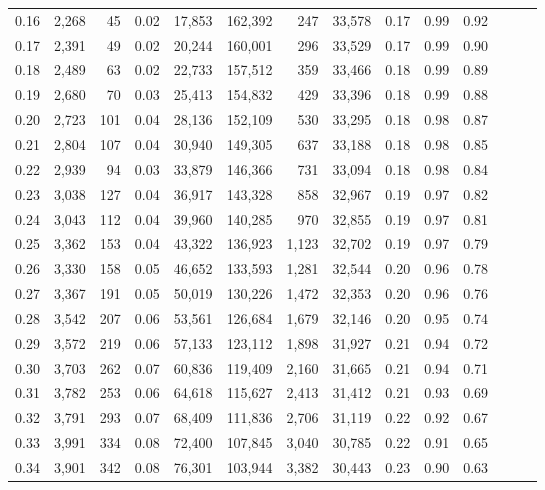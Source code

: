 \begin{tabular}{rrrrrrrrrrrrrr}
0.16 &  2,268 &   45 &  0.02 &   17,853 &  162,392 &     247 &  33,578 &  0.17 &  0.99 &      0.92 \\
0.17 &  2,391 &   49 &  0.02 &   20,244 &  160,001 &     296 &  33,529 &  0.17 &  0.99 &      0.90 \\
0.18 &  2,489 &   63 &  0.02 &   22,733 &  157,512 &     359 &  33,466 &  0.18 &  0.99 &      0.89 \\
0.19 &  2,680 &   70 &  0.03 &   25,413 &  154,832 &     429 &  33,396 &  0.18 &  0.99 &      0.88 \\
0.20 &  2,723 &  101 &  0.04 &   28,136 &  152,109 &     530 &  33,295 &  0.18 &  0.98 &      0.87 \\
0.21 &  2,804 &  107 &  0.04 &   30,940 &  149,305 &     637 &  33,188 &  0.18 &  0.98 &      0.85 \\
0.22 &  2,939 &   94 &  0.03 &   33,879 &  146,366 &     731 &  33,094 &  0.18 &  0.98 &      0.84 \\
0.23 &  3,038 &  127 &  0.04 &   36,917 &  143,328 &     858 &  32,967 &  0.19 &  0.97 &      0.82 \\
0.24 &  3,043 &  112 &  0.04 &   39,960 &  140,285 &     970 &  32,855 &  0.19 &  0.97 &      0.81 \\
0.25 &  3,362 &  153 &  0.04 &   43,322 &  136,923 &   1,123 &  32,702 &  0.19 &  0.97 &      0.79 \\
0.26 &  3,330 &  158 &  0.05 &   46,652 &  133,593 &   1,281 &  32,544 &  0.20 &  0.96 &      0.78 \\
0.27 &  3,367 &  191 &  0.05 &   50,019 &  130,226 &   1,472 &  32,353 &  0.20 &  0.96 &      0.76 \\
0.28 &  3,542 &  207 &  0.06 &   53,561 &  126,684 &   1,679 &  32,146 &  0.20 &  0.95 &      0.74 \\
0.29 &  3,572 &  219 &  0.06 &   57,133 &  123,112 &   1,898 &  31,927 &  0.21 &  0.94 &      0.72 \\
0.30 &  3,703 &  262 &  0.07 &   60,836 &  119,409 &   2,160 &  31,665 &  0.21 &  0.94 &      0.71 \\
0.31 &  3,782 &  253 &  0.06 &   64,618 &  115,627 &   2,413 &  31,412 &  0.21 &  0.93 &      0.69 \\
0.32 &  3,791 &  293 &  0.07 &   68,409 &  111,836 &   2,706 &  31,119 &  0.22 &  0.92 &      0.67 \\
0.33 &  3,991 &  334 &  0.08 &   72,400 &  107,845 &   3,040 &  30,785 &  0.22 &  0.91 &      0.65 \\
0.34 &  3,901 &  342 &  0.08 &   76,301 &  103,944 &   3,382 &  30,443 &  0.23 &  0.90 &      0.63 \\

\end{tabular}
